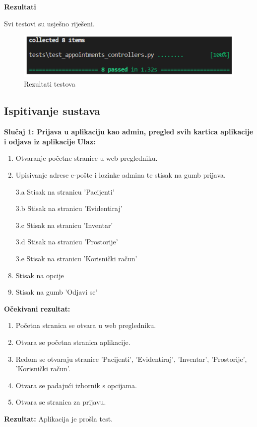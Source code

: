 	 \textbf{Rezultati}
	 
	 
	 Svi testovi su usješno riješeni.
	 
	 \begin{figure}[H]
				\includegraphics[scale=0.3]{slike/rezultati_testova.PNG} %
				\centering
				\caption{Rezultati testova}
				\label{fig:rezultati_testova}
			\end{figure}
	 
	 
			

			
			\subsection{Ispitivanje sustava}
			

\textbf{Slučaj 1: Prijava u aplikaciju kao admin, pregled svih kartica aplikacije i odjava iz aplikacije}
\textbf{Ulaz:}
\begin{enumerate}
    \item Otvaranje početne stranice u web pregledniku.
    \item Upisivanje adrese e-pošte i lozinke admina te stisak na gumb prijava.
    \item[3.a] Stisak na stranicu 'Pacijenti'
    \item[3.b] Stisak na stranicu 'Evidentiraj'
    \item[3.c] Stisak na stranicu 'Inventar'
    \item[3.d] Stisak na stranicu 'Prostorije'
    \item[3.e] Stisak na stranicu 'Korisnički račun'
    \item Stisak na opcije
    \item Stisak na gumb 'Odjavi se'
\end{enumerate}
\textbf{Očekivani rezultat:}
\begin{enumerate}
    \item Početna stranica se otvara u web pregledniku.
    \item Otvara se početna stranica aplikacije.
    \item Redom se otvaraju stranice 'Pacijenti', 'Evidentiraj', 'Inventar', 'Prostorije', 'Korisnički račun'.
    \item Otvara se padajući izbornik s opcijama.
    \item Otvara se stranica za prijavu.
\end{enumerate}
\textbf{Rezultat:} Aplikacija je prošla test.

